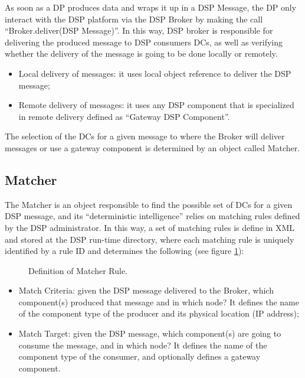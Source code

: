 \documentclass[conference]{IEEEtran}
\begin{document}
As soon as a DP produces data and wraps it up in a DSP Message, the DP only
interact with the DSP platform via the DSP Broker by making the call
``Broker.deliver(DSP Message)''. In this way, DSP broker is responsible for
delivering the produced message to DSP consumers DCs, as well as verifying
whether the delivery of the message is going to be done locally or remotely. 

\begin{itemize}
 \item Local delivery of messages: it uses local object reference to deliver the
DSP message;
 \item Remote delivery of messages: it uses any DSP component that is
specialized in remote delivery defined as ``Gateway DSP Component''.
\end{itemize}

The selection of the DCs for a given message to where the Broker will deliver
messages or use a gateway component is determined by an object called Matcher.

\subsection{Matcher}

The Matcher is an object responsible to find the possible set of DCs for a given
DSP message, and its ``deterministic intelligence'' relies on matching rules
defined by the DSP administrator. In this way, a set of matching rules is define
in XML and stored at the DSP run-time directory, where each matching rule is
uniquely identified by a rule ID and determines the following (see
figure \ref{FIG_MATCHER_RULE}):

\begin{figure}[!htb]
 \caption{\label{FIG_MATCHER_RULE} Definition of Matcher Rule.}
\end{figure}

\begin{itemize}
 \item Match Criteria: given the DSP message delivered to the Broker, which
component(s) produced that message and in which node? It defines the name of
the component type of the producer and its physical location (IP address);
 \item Match Target: given the DSP message, which component(s) are going
to consume the message, and in which node? It defines the name of the component
type of the consumer, and optionally defines a gateway component.
\end{itemize}
\end{document}
